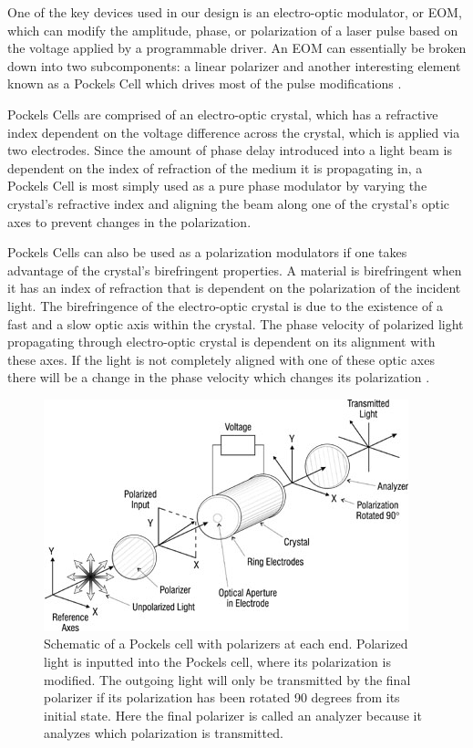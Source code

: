 \documentclass[pdftex,12pt,a4paper]{article}
\begin{document}
One of the key devices used in our design is an electro-optic modulator, or EOM, which can modify the amplitude, phase, or polarization of a laser pulse based on the voltage applied by a programmable driver. An EOM can essentially be broken down into two subcomponents: a linear polarizer and another interesting element known as a Pockels Cell which drives most of the pulse modifications \cite{RP_EOM}.

Pockels Cells are comprised of an electro-optic crystal, which has a refractive index dependent on the voltage difference across the crystal, which is applied via two electrodes. Since the amount of phase delay introduced into a light beam is dependent on the index of refraction of the medium it is propagating in, a Pockels Cell is most simply used as a pure phase modulator by varying the crystal's refractive index and aligning the beam along one of the crystal's optic axes to prevent changes in the polarization\cite{RP_Pockels_Cell}.      

Pockels Cells can also be used as a polarization modulators if one takes advantage of the crystal's birefringent properties. A material is birefringent when it has an index of refraction that is dependent on the polarization of the incident light. The birefringence of the electro-optic crystal is due to the existence of a fast and a slow optic axis within the crystal. The phase velocity of polarized light propagating through electro-optic crystal is dependent on its alignment with these axes. If the light is not completely aligned with one of these optic axes there will be a change in the phase velocity which changes its polarization \cite{RP_Birefringence}.

\begin{figure}[t]
  \centering
    \includegraphics[scale=2.75]{PCschematic}
  \caption{Schematic of a Pockels cell with polarizers at each end. Polarized light is inputted into the Pockels cell, where its polarization is modified. The outgoing light will only be transmitted by the final polarizer if its polarization has been rotated 90 degrees from its initial state. Here the final polarizer is called an analyzer because it analyzes which polarization is transmitted\cite{simcik_module}.}
  \label{fig:PCschematic}
\end{figure}
\end{document}
